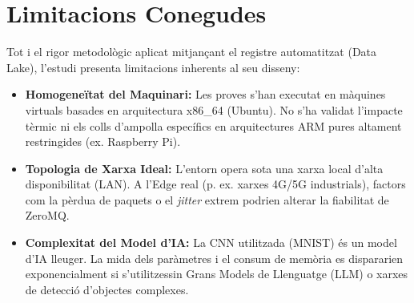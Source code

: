 \section{Limitacions Conegudes}
Tot i el rigor metodològic aplicat mitjançant el registre automatitzat (Data Lake), l'estudi presenta limitacions inherents al seu disseny:
\begin{itemize}
    \item \textbf{Homogeneïtat del Maquinari:} Les proves s'han executat en màquines virtuals basades en arquitectura x86\_64 (Ubuntu). No s'ha validat l'impacte tèrmic ni els colls d'ampolla específics en arquitectures ARM pures altament restringides (ex. Raspberry Pi).
    \item \textbf{Topologia de Xarxa Ideal:} L'entorn opera sota una xarxa local d'alta disponibilitat (LAN). A l'Edge real (p. ex. xarxes 4G/5G industrials), factors com la pèrdua de paquets o el \textit{jitter} extrem podrien alterar la fiabilitat de ZeroMQ.
    \item \textbf{Complexitat del Model d'IA:} La CNN utilitzada (MNIST) és un model d'IA lleuger. La mida dels paràmetres i el consum de memòria es dispararien exponencialment si s'utilitzessin Grans Models de Llenguatge (LLM) o xarxes de detecció d'objectes complexes.
\end{itemize}

